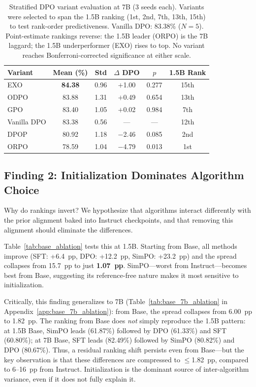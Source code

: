 \documentclass{article}
\begin{document}
\begin{table}[t]
\centering
\caption{Stratified DPO variant evaluation at 7B (3 seeds each). Variants were selected to span the 1.5B ranking (1st, 2nd, 7th, 13th, 15th) to test rank-order predictiveness. Vanilla DPO: 83.38\% ($N{=}5$). Point-estimate rankings reverse: the 1.5B leader (ORPO) is the 7B laggard; the 1.5B underperformer (EXO) rises to top. No variant reaches Bonferroni-corrected significance at either scale.}
\label{tab:dpo_variant_7b}
\small
\begin{tabular}{@{}lccccc@{}}
\toprule
\textbf{Variant} & \textbf{Mean (\%)} & \textbf{Std} & \textbf{$\Delta$ DPO} & \textbf{$p$} & \textbf{1.5B Rank} \\
\midrule
EXO & \textbf{84.38} & 0.96 & $+$1.00 & 0.277 & 15th \\
ODPO & 83.88 & 1.31 & $+$0.49 & 0.654 & 13th \\
GPO & 83.40 & 1.05 & $+$0.02 & 0.984 & 7th \\
Vanilla DPO & 83.38 & 0.56 & --- & --- & 12th \\
DPOP & 80.92 & 1.18 & $-$2.46 & 0.085 & 2nd \\
ORPO & 78.59 & 1.04 & $-$4.79 & 0.013 & 1st \\
\bottomrule
\end{tabular}
\end{table}

\subsection{Finding 2: Initialization Dominates Algorithm Choice}
\label{sec:base_ablation}

Why do rankings invert? We hypothesize that algorithms interact differently with the prior alignment baked into Instruct checkpoints, and that removing this alignment should eliminate the differences.

Table~\ref{tab:base_ablation} tests this at 1.5B. Starting from Base, all methods improve (SFT: +6.4~pp, DPO: +12.2~pp, SimPO: +23.2~pp) and the spread collapses from 15.7~pp to just \textbf{1.07~pp}.
SimPO---worst from Instruct---becomes best from Base, suggesting its reference-free nature makes it most sensitive to initialization.

Critically, this finding generalizes to 7B (Table~\ref{tab:base_7b_ablation} in Appendix~\ref{app:base_7b_ablation}): from Base, the spread collapses from 6.00~pp to 1.82~pp. The ranking from Base does \emph{not} simply reproduce the 1.5B pattern: at 1.5B Base, SimPO leads (61.87\%) followed by DPO (61.33\%) and SFT (60.80\%); at 7B Base, SFT leads (82.49\%) followed by SimPO (80.82\%) and DPO (80.67\%). Thus, a residual ranking shift persists even from Base---but the key observation is that these differences are compressed to $\leq$1.82~pp, compared to 6--16~pp from Instruct. Initialization is the dominant source of inter-algorithm variance, even if it does not fully explain it.
\end{document}
